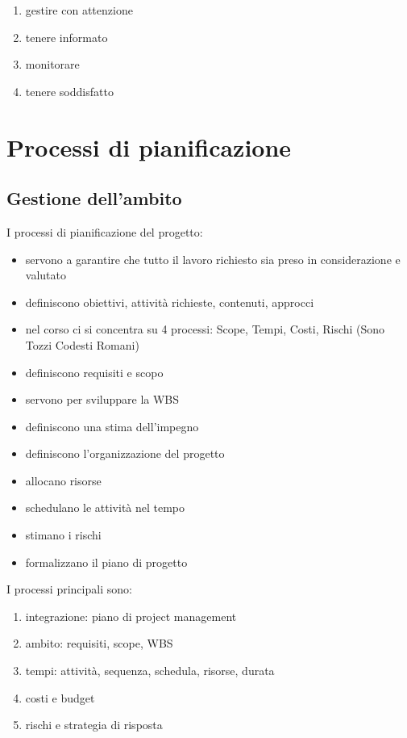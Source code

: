 \documentclass[answers, a4paper, 11pt]{exam}
\begin{document}
\begin{enumerate}
    \item gestire con attenzione
    \item tenere informato
    \item monitorare
    \item tenere soddisfatto
\end{enumerate}

\section{Processi di pianificazione}

\subsection{Gestione dell'ambito}

I processi di pianificazione del progetto:

\begin{itemize}
    \item servono a garantire che tutto il lavoro richiesto sia preso in considerazione e valutato
    \item definiscono obiettivi, attività richieste, contenuti, approcci
    \item nel corso ci si concentra su 4 processi: Scope, Tempi, Costi, Rischi (Sono Tozzi Codesti Romani)
    \item definiscono requisiti e scopo
    \item servono per sviluppare la WBS
    \item definiscono una stima dell'impegno
    \item definiscono l'organizzazione del progetto
    \item allocano risorse
    \item schedulano le attività nel tempo
    \item stimano i rischi
    \item formalizzano il piano di progetto
\end{itemize}

I processi principali sono:

\begin{enumerate}
    \item integrazione: piano di project management
    \item ambito: requisiti, scope, WBS
    \item tempi: attività, sequenza, schedula, risorse, durata
    \item costi e budget
    \item rischi e strategia di risposta
\end{enumerate}
\end{document}
